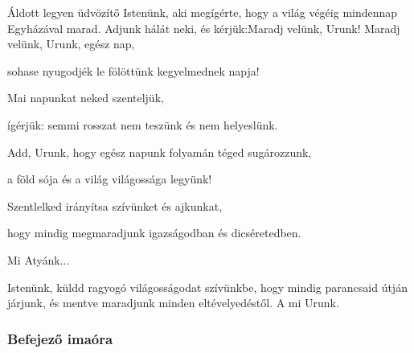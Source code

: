 \documentclass[twoside]{article}
\begin{document}

\begin{preces}{Áldott legyen üdvözítő Istenünk, aki megígérte, hogy a világ végéig mindennap Egyházával marad. Adjunk hálát neki, és kérjük:}{Maradj velünk, Urunk!}
  Maradj velünk, Urunk, egész nap,

  \reddash sohase nyugodjék le fölöttünk kegyelmednek napja!

  Mai napunkat neked szenteljük,

  \reddash ígérjük: semmi rosszat nem teszünk és nem helyeslünk.

  Add, Urunk, hogy egész napunk folyamán téged sugározzunk,

  \reddash a föld sója és a világ világossága legyünk!

  Szentlelked irányítsa szívünket és ajkunkat,

  \reddash hogy mindig megmaradjunk igazságodban és dicséretedben.
\end{preces}
Mi Atyánk...


Istenünk, küldd ragyogó világosságodat szívünkbe, hogy mindig parancsaid útján járjunk, és mentve maradjunk minden eltévelyedéstől. A mi Urunk.

\subsubsection*{Befejező imaóra}

\label{f4/Compl}




\begin{psalmsheet}[tone=6, continuous, number={30. zsoltár, 2-6}, title={Üldözött ember bizakodó imádsága}, motto={Atyám, kezedbe ajánlom lelkemet (Lk 23, 46).}]
\end{psalmsheet}
\end{document}
